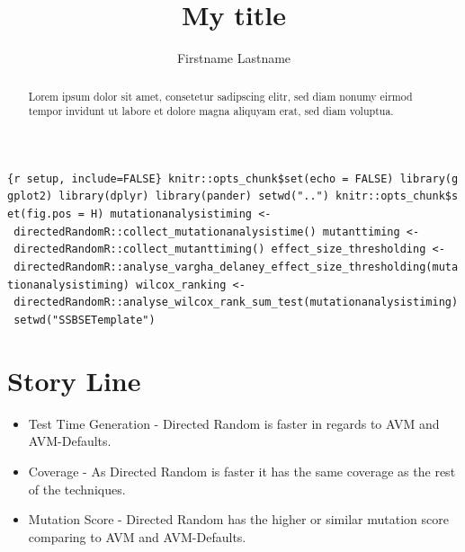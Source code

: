 \documentclass[runningheads,a4paper]{llncs}
\def\tightlist{} %
\begin{document}


\title{My title}
\author{Firstname Lastname}




%

\maketitle

	\begin{abstract}
		Lorem ipsum dolor sit amet, consetetur sadipscing elitr, sed diam nonumy
eirmod tempor invidunt ut labore et dolore magna aliquyam erat, sed diam
voluptua.
	\end{abstract}


\texttt{\{r\ setup,\ include=FALSE\}\ knitr::opts\_chunk\$set(echo\ =\ FALSE)\ library(ggplot2)\ library(dplyr)\ library(pander)\ setwd("..")\ knitr::opts\_chunk\$set(fig.pos\ =\ \textquotesingle{}H\textquotesingle{})\ mutationanalysistiming\ \textless{}-\ directedRandomR::collect\_mutationanalysistime()\ mutanttiming\ \textless{}-\ directedRandomR::collect\_mutanttiming()\ effect\_size\_thresholding\ \textless{}-\ directedRandomR::analyse\_vargha\_delaney\_effect\_size\_thresholding(mutationanalysistiming)\ wilcox\_ranking\ \textless{}-\ directedRandomR::analyse\_wilcox\_rank\_sum\_test(mutationanalysistiming)\ setwd("SSBSETemplate")}

\section{Story Line}\label{story-line}

\begin{itemize}
\tightlist
\item
  Test Time Generation - Directed Random is faster in regards to AVM and
  AVM-Defaults.
\item
  Coverage - As Directed Random is faster it has the same coverage as
  the rest of the techniques.
\item
  Mutation Score - Directed Random has the higher or similar mutation
  score comparing to AVM and AVM-Defaults.
\end{itemize}
\end{document}
